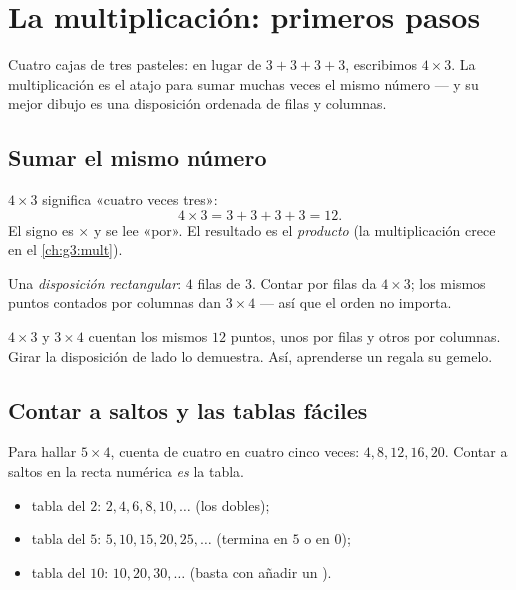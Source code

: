 \chapter{La multiplicación: primeros pasos}\label{ch:g2:mult}

Cuatro cajas de tres pasteles: en lugar de $3 + 3 + 3 + 3$, escribimos
$4 \times 3$. La multiplicación es el atajo para sumar muchas veces el mismo
número --- y su mejor dibujo es una disposición ordenada de filas
y columnas.

\section{Sumar el mismo número}

\begin{definition}[La multiplicación]\label{def:g2:mult:def}
$4 \times 3$ significa «cuatro veces tres»:
\[
4 \times 3 = 3 + 3 + 3 + 3 = 12 .
\]
El signo es $\times$ y se lee «por». El resultado es el
\emph{producto} (la multiplicación crece en el \cref{ch:g3:mult}).
\end{definition}

\begin{omfigure}

{\small Una \emph{disposición rectangular}: $4$ filas de $3$. Contar por filas da
$4 \times 3$; los mismos puntos contados por columnas dan $3 \times 4$ --- así que
el orden no importa.}
\end{omfigure}

\begin{example}\label{ex:g2:mult:order}
$4 \times 3$ y $3 \times 4$ cuentan los mismos $12$ puntos, unos por
filas y otros por columnas. Girar la disposición de lado lo demuestra. Así,
aprenderse un  regala su gemelo.
\end{example}

\section{Contar a saltos y las tablas fáciles}

\begin{method}\label{met:g2:mult:skip}
Para hallar $5 \times 4$, cuenta de cuatro en cuatro cinco veces:
$4, 8, 12, 16, 20$. Contar a saltos en la recta numérica \emph{es}
la tabla.
\begin{itemize}
  \item tabla del $2$: $2, 4, 6, 8, 10, \dots$ (los dobles);
  \item tabla del $5$: $5, 10, 15, 20, 25, \dots$ (termina en $5$ o en
        $0$);
  \item tabla del $10$: $10, 20, 30, \dots$ (basta con añadir un ).
\end{itemize}
\end{method}

